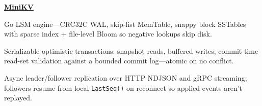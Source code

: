 \begin{twocolentry}{}
\href{https://github.com/faketut/MiniKV}{\textbf{MiniKV}}
\end{twocolentry}
\begin{onecolentry}
\begin{highlights}
\item Go LSM engine---CRC32C WAL, skip-list MemTable, snappy block SSTables with sparse index + file-level Bloom so negative lookups skip disk.
\item Serializable optimistic transactions: snapshot reads, buffered writes, commit-time read-set validation against a bounded commit log---atomic on no conflict.
\item Async leader/follower replication over HTTP NDJSON and gRPC streaming; followers resume from local \texttt{LastSeq()} on reconnect so applied events aren't replayed.
\end{highlights}
\end{onecolentry}
